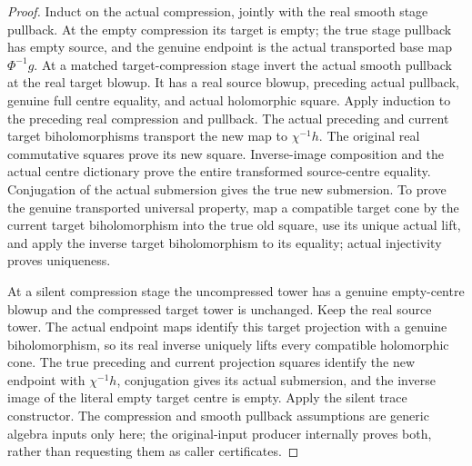 \begin{proof}
Induct on the actual compression, jointly with the real smooth stage pullback. At the empty compression its target is empty; the true stage pullback has empty source, and the genuine endpoint is the actual transported base map $\Phi^{-1}g$. At a matched target-compression stage invert the actual smooth pullback at the real target blowup. It has a real source blowup, preceding actual pullback, genuine full centre equality, and actual holomorphic square. Apply induction to the preceding real compression and pullback. The actual preceding and current target biholomorphisms transport the new map to $\chi^{-1}h$. The original real commutative squares prove its new square. Inverse-image composition and the actual centre dictionary prove the entire transformed source-centre equality. Conjugation of the actual submersion gives the true new submersion. To prove the genuine transported universal property, map a compatible target cone by the current target biholomorphism into the true old square, use its unique actual lift, and apply the inverse target biholomorphism to its equality; actual injectivity proves uniqueness.

At a silent compression stage the uncompressed tower has a genuine empty-centre blowup and the compressed target tower is unchanged. Keep the real source tower. The actual endpoint maps identify this target projection with a genuine biholomorphism, so its real inverse uniquely lifts every compatible holomorphic cone. The true preceding and current projection squares identify the new endpoint with $\chi^{-1}h$, conjugation gives its actual submersion, and the inverse image of the literal empty target centre is empty. Apply the silent trace constructor. The compression and smooth pullback assumptions are generic algebra inputs only here; the original-input producer internally proves both, rather than requesting them as caller certificates.
\end{proof}

